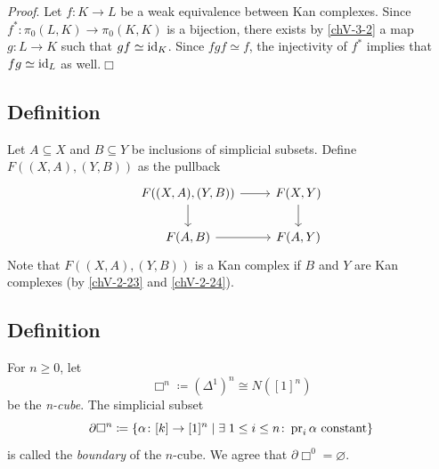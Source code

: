         \emph{Proof}. Let $f \colon K \to L$ be a weak equivalence between Kan complexes. Since $f^{*} \colon \pi_0(L, K) \to \pi_0(K, K)$ is a bijection, there exists by \ref{chV-3-2} a map $g \colon L \to K$ such that $gf \simeq \operatorname{id}_K$. Since $fgf \simeq f$, the injectivity of $f^{*}$ implies that $fg \simeq \operatorname{id}_L$ as well.\hfill$\Box$

    \subsection{Definition}\label{chV-3-4}
        Let $A \subseteq X$ and $B \subseteq Y$ be inclusions of simplicial subsets. Define $F((X, A),(Y, B))$ as the pullback
        \begin{equation*}
            \begin{tikzcd}
                F((X, A), (Y, B)) \arrow[d] \arrow[r] & F(X, Y) \arrow[d] \\
                F(A, B) \arrow[r] & F(A, Y)
            \end{tikzcd}
        \end{equation*}
        Note that $F((X, A),(Y, B))$ is a Kan complex if $B$ and $Y$ are Kan complexes (by \ref{chV-2-23} and \ref{chV-2-24}).

    \subsection{Definition}\label{chV-3-5}
        For $n \geq 0$, let
        \begin{equation*}
            \Box^n \coloneq (\Delta^1)^n \cong N([1]^n)
        \end{equation*}
        be the \emph{n-cube}. The simplicial subset
        \begin{equation*}
            \partial \Box^n \coloneq \{\alpha \colon [k] \to [1]^n \mid \exists \; 1 \leq i \leq n \colon \operatorname{pr}_i \alpha \text{ constant} \}
        \end{equation*}
        is called the \emph{boundary} of the $n$-cube. We agree that $\partial \Box^0 = \varnothing$.

